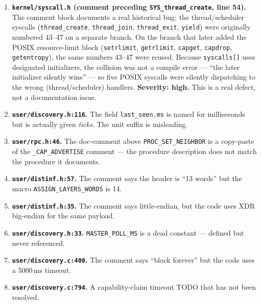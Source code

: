 \documentclass[11pt,a4paper]{article}
\begin{document}
\begin{enumerate}[leftmargin=*]

\item \textbf{\texttt{kernel/syscall.h} (comment preceding \texttt{SYS\_thread\_create}, line 54).}
The comment block documents a real historical bug: the thread/scheduler syscalls (\texttt{thread\_create}, \texttt{thread\_join}, \texttt{thread\_exit}, \texttt{yield}) were originally numbered 43--47 on a separate branch. On the branch that later added the POSIX resource-limit block (\texttt{setrlimit}, \texttt{getrlimit}, \texttt{capget}, \texttt{capdrop}, \texttt{getentropy}), the same numbers 43--47 were reused. Because \texttt{syscalls[]} uses designated initializers, the collision was not a compile error --- ``the later initializer silently wins'' --- so five POSIX syscalls were silently dispatching to the wrong (thread/scheduler) handlers. \textbf{Severity: high.} This is a real defect, not a documentation issue.

\item \textbf{\texttt{user/discovery.h:116}.}
The field \texttt{last\_seen.ms} is named for milliseconds but is actually given \emph{ticks}. The unit suffix is misleading.

\item \textbf{\texttt{user/rpc.h:46}.}
The doc-comment above \texttt{PROC\_SET\_NEIGHBOR} is a copy-paste of the \texttt{\_CAP\_ADVERTISE} comment --- the procedure description does not match the procedure it documents.

\item \textbf{\texttt{user/distinf.h:57}.}
The comment says the header is ``13 words'' but the macro \texttt{ASSIGN\_LAYERS\_WORDS} is 14.

\item \textbf{\texttt{user/distinf.h:35}.}
The comment says little-endian, but the code uses XDR big-endian for the same payload.

\item \textbf{\texttt{user/discovery.h:33}.}
\texttt{MASTER\_POLL\_MS} is a dead constant --- defined but never referenced.

\item \textbf{\texttt{user/discovery.c:400}.}
The comment says ``block forever'' but the code uses a 5000\,ms timeout.

\item \textbf{\texttt{user/discovery.c:794}.}
A capability-claim timeout TODO that has not been resolved.


\end{enumerate}
\end{document}
